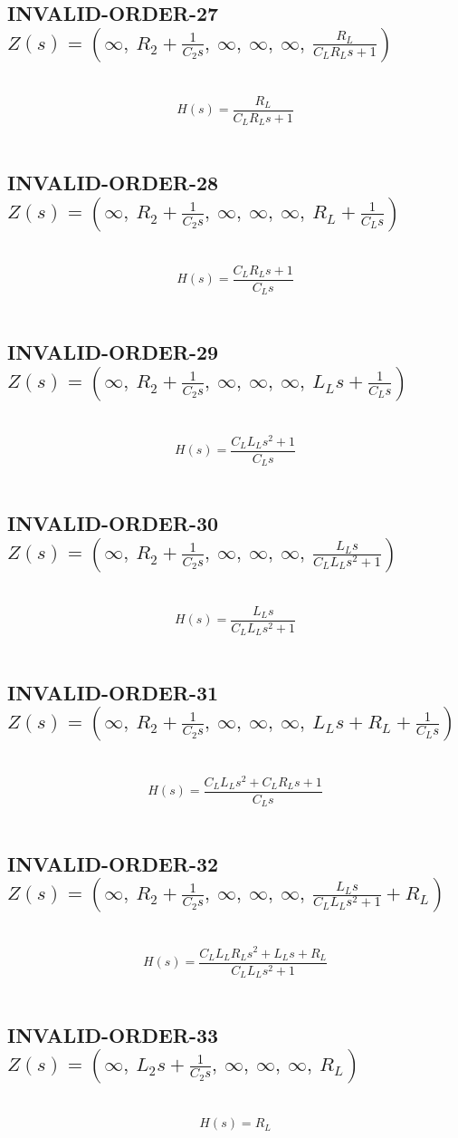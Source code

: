 \documentclass{article}
\begin{document}
\subsection{INVALID-ORDER-27 $Z(s) = \left( \infty, \  R_{2} + \frac{1}{C_{2} s}, \  \infty, \  \infty, \  \infty, \  \frac{R_{L}}{C_{L} R_{L} s + 1}\right)$ } \ 
\textbf{\[H(s) = \frac{R_{L}}{C_{L} R_{L} s + 1}\] } \ 
\subsection{INVALID-ORDER-28 $Z(s) = \left( \infty, \  R_{2} + \frac{1}{C_{2} s}, \  \infty, \  \infty, \  \infty, \  R_{L} + \frac{1}{C_{L} s}\right)$ } \ 
\textbf{\[H(s) = \frac{C_{L} R_{L} s + 1}{C_{L} s}\] } \ 
\subsection{INVALID-ORDER-29 $Z(s) = \left( \infty, \  R_{2} + \frac{1}{C_{2} s}, \  \infty, \  \infty, \  \infty, \  L_{L} s + \frac{1}{C_{L} s}\right)$ } \ 
\textbf{\[H(s) = \frac{C_{L} L_{L} s^{2} + 1}{C_{L} s}\] } \ 
\subsection{INVALID-ORDER-30 $Z(s) = \left( \infty, \  R_{2} + \frac{1}{C_{2} s}, \  \infty, \  \infty, \  \infty, \  \frac{L_{L} s}{C_{L} L_{L} s^{2} + 1}\right)$ } \ 
\textbf{\[H(s) = \frac{L_{L} s}{C_{L} L_{L} s^{2} + 1}\] } \ 
\subsection{INVALID-ORDER-31 $Z(s) = \left( \infty, \  R_{2} + \frac{1}{C_{2} s}, \  \infty, \  \infty, \  \infty, \  L_{L} s + R_{L} + \frac{1}{C_{L} s}\right)$ } \ 
\textbf{\[H(s) = \frac{C_{L} L_{L} s^{2} + C_{L} R_{L} s + 1}{C_{L} s}\] } \ 
\subsection{INVALID-ORDER-32 $Z(s) = \left( \infty, \  R_{2} + \frac{1}{C_{2} s}, \  \infty, \  \infty, \  \infty, \  \frac{L_{L} s}{C_{L} L_{L} s^{2} + 1} + R_{L}\right)$ } \ 
\textbf{\[H(s) = \frac{C_{L} L_{L} R_{L} s^{2} + L_{L} s + R_{L}}{C_{L} L_{L} s^{2} + 1}\] } \ 
\subsection{INVALID-ORDER-33 $Z(s) = \left( \infty, \  L_{2} s + \frac{1}{C_{2} s}, \  \infty, \  \infty, \  \infty, \  R_{L}\right)$ } \ 
\textbf{\[H(s) = R_{L}\] } \ 
\end{document}
